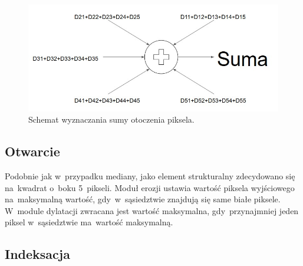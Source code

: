 \begin{figure}[h]
	\centering
	\includegraphics[width=\textwidth]{drzewo_sumacyjne.jpg}
	\caption{Schemat wyznaczania sumy otoczenia piksela.}
	\label{fig:drzewo_sumacyjne}
\end{figure}  

\subsection{Otwarcie}
\label{subsec:erozja}

Podobnie jak w~przypadku mediany, jako element strukturalny zdecydowano się na~kwadrat o~boku 5~pikseli. 
Moduł erozji ustawia wartość piksela wyjściowego na~maksymalną wartość, gdy~w~sąsiedztwie znajdują się same białe piksele. 
W~module dylatacji zwracana jest wartość maksymalna, gdy~przynajmniej jeden piksel w~sąsiedztwie ma~wartość maksymalną.

\subsection{Indeksacja}
\label{subsec:indeksacja}

